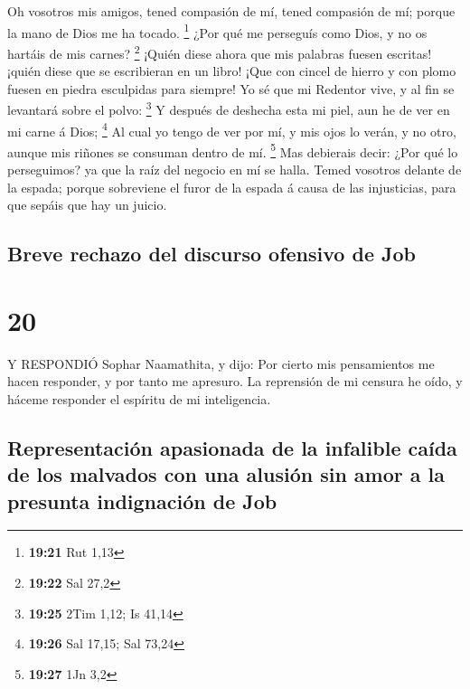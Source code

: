  Oh vosotros mis amigos, tened compasión de mí, tened
compasión de mí; porque la mano de Dios me ha tocado. \footnote{\textbf{19:21}
  Rut 1,13}  ¿Por qué me perseguís como Dios, y no os
hartáis de mis carnes? \footnote{\textbf{19:22} Sal 27,2} 
¡Quién diese ahora que mis palabras fuesen escritas! ¡quién diese que se
escribieran en un libro!  ¡Que con cincel de hierro y con
plomo fuesen en piedra esculpidas para siempre!  Yo sé que
mi Redentor vive, y al fin se levantará sobre el polvo: \footnote{\textbf{19:25}
  2Tim 1,12; Is 41,14}  Y después de deshecha esta mi piel,
aun he de ver en mi carne á Dios; \footnote{\textbf{19:26} Sal 17,15;
  Sal 73,24}  Al cual yo tengo de ver por mí, y mis ojos lo
verán, y no otro, aunque mis riñones se consuman dentro de mí.
\footnote{\textbf{19:27} 1Jn 3,2}  Mas debierais decir:
¿Por qué lo perseguimos? ya que la raíz del negocio en mí se halla.
 Temed vosotros delante de la espada; porque sobreviene el
furor de la espada á causa de las injusticias, para que sepáis que hay
un juicio.

\hypertarget{breve-rechazo-del-discurso-ofensivo-de-job}{%
\subsection{Breve rechazo del discurso ofensivo de
Job}\label{breve-rechazo-del-discurso-ofensivo-de-job}}

\hypertarget{section-19}{%
\section{20}\label{section-19}}

 Y RESPONDIÓ Sophar Naamathita, y dijo:  Por
cierto mis pensamientos me hacen responder, y por tanto me apresuro.
 La reprensión de mi censura he oído, y háceme responder el
espíritu de mi inteligencia.

\hypertarget{representaciuxf3n-apasionada-de-la-infalible-cauxedda-de-los-malvados-con-una-alusiuxf3n-sin-amor-a-la-presunta-indignaciuxf3n-de-job}{%
\subsection{Representación apasionada de la infalible caída de los
malvados con una alusión sin amor a la presunta indignación de
Job}\label{representaciuxf3n-apasionada-de-la-infalible-cauxedda-de-los-malvados-con-una-alusiuxf3n-sin-amor-a-la-presunta-indignaciuxf3n-de-job}}

